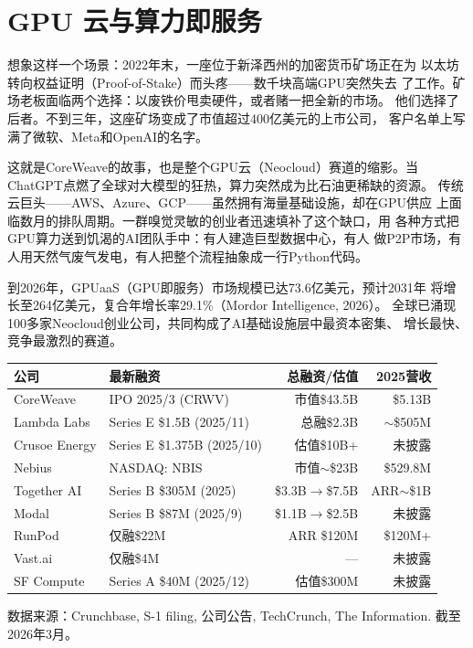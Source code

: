 
\section{GPU 云与算力即服务}
\label{sec:infra-gpu-cloud}

想象这样一个场景：2022年末，一座位于新泽西州的加密货币矿场正在为
以太坊转向权益证明（Proof-of-Stake）而头疼——数千块高端GPU突然失去
了工作。矿场老板面临两个选择：以废铁价甩卖硬件，或者赌一把全新的市场。
他们选择了后者。不到三年，这座矿场变成了市值超过400亿美元的上市公司，
客户名单上写满了微软、Meta和OpenAI的名字。

这就是CoreWeave的故事，也是整个GPU云（Neocloud）赛道的缩影。当
ChatGPT点燃了全球对大模型的狂热，算力突然成为比石油更稀缺的资源。
传统云巨头——AWS、Azure、GCP——虽然拥有海量基础设施，却在GPU供应
上面临数月的排队周期。一群嗅觉灵敏的创业者迅速填补了这个缺口，用
各种方式把GPU算力送到饥渴的AI团队手中：有人建造巨型数据中心，有人
做P2P市场，有人用天然气废气发电，有人把整个流程抽象成一行Python代码。

到2026年，GPUaaS（GPU即服务）市场规模已达73.6亿美元，预计2031年
将增长至264亿美元，复合年增长率29.1\%（Mordor Intelligence, 2026）。
全球已涌现100多家Neocloud创业公司，共同构成了AI基础设施层中最资本密集、
增长最快、竞争最激烈的赛道。

\begin{keybox}
\small
\begin{tabularx}{\textwidth}{l X r r}
\toprule
\rowcolor{figLightGray}
\textbf{公司} & \textbf{最新融资} & \textbf{总融资/估值} & \textbf{2025营收} \\
\midrule
CoreWeave      & IPO 2025/3 (CRWV)          & 市值\$43.5B          & \$5.13B \\
Lambda Labs    & Series E \$1.5B (2025/11)  & 总融\$2.3B           & $\sim$\$505M \\
Crusoe Energy  & Series E \$1.375B (2025/10)& 估值\$10B+           & 未披露 \\
Nebius         & NASDAQ: NBIS               & 市值$\sim$\$23B      & \$529.8M \\
Together AI    & Series B \$305M (2025)     & \$3.3B$\to$\$7.5B   & ARR$\sim$\$1B \\
Modal          & Series B \$87M (2025/9)    & \$1.1B$\to$\$2.5B   & 未披露 \\
RunPod         & 仅融\$22M                   & ARR \$120M           & \$120M+ \\
Vast.ai        & 仅融\$4M                    & ---                  & 未披露 \\
SF Compute     & Series A \$40M (2025/12)   & 估值\$300M           & 未披露 \\
\bottomrule
\end{tabularx}

\medskip
\noindent 数据来源：Crunchbase, S-1 filing, 公司公告, TechCrunch,
The Information. 截至2026年3月。
\end{keybox}

